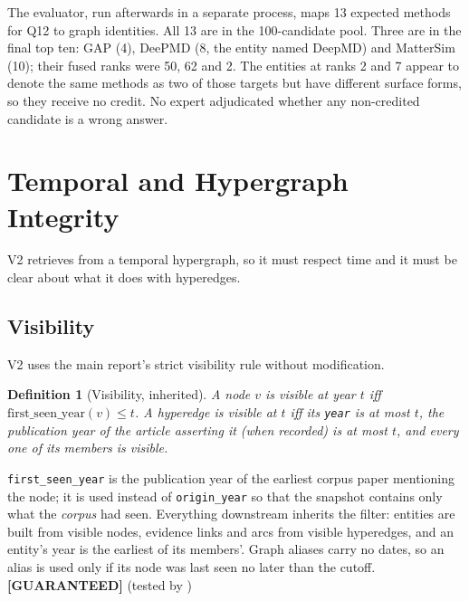\documentclass[11pt,a4paper]{article}
\newtheorem{definition}{Definition}[section]
\theoremstyle{remark}
\newcommand{\code}[1]{\texttt{\small #1}}
\newcommand{\vtag}[2]{{\sffamily\scriptsize\bfseries\textcolor{#1}{[#2]}}}
\newcommand{\Gtag}{\vtag{accent}{GUARANTEED}}
\begin{document}
\begin{cautionbox}
The evaluator, run afterwards in a separate process, maps 13 expected methods for Q12 to
graph identities. All 13 are in the 100-candidate pool. Three are in the final top ten:
GAP (4), DeePMD (8, the entity named DeepMD) and MatterSim (10); their fused ranks were
50, 62 and 2. The entities at ranks 2 and 7 appear to denote the same methods as two of
those targets but have different surface forms, so they receive no credit. No expert
adjudicated whether any non-credited candidate is a wrong answer.
\end{cautionbox}

\section{Temporal and Hypergraph Integrity}
\label{sec:temporal}

V2 retrieves from a temporal hypergraph, so it must respect time and it must be clear
about what it does with hyperedges.

\subsection{Visibility}

V2 uses the main report's strict visibility rule without modification.

\begin{definition}[Visibility, inherited]
A node $v$ is visible at year $t$ iff $\mathrm{first\_seen\_year}(v)\le t$. A hyperedge
is visible at $t$ iff its \code{year} is at most $t$, the publication year of the article
asserting it (when recorded) is at most $t$, and every one of its members is visible.
\end{definition}

\code{first\_seen\_year} is the publication year of the earliest corpus paper mentioning
the node; it is used instead of \code{origin\_year} so that the snapshot contains only
what the \emph{corpus} had seen. Everything downstream inherits the filter: entities are
built from visible nodes, evidence links and arcs from visible hyperedges, and an entity's
year is the earliest of its members'. Graph aliases carry no dates, so an alias is used
only if its node was last seen no later than the cutoff. \Gtag{} (tested by
)
\end{document}
